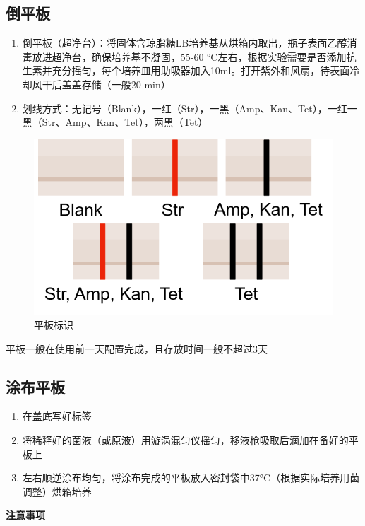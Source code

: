 \documentclass[
]{book}
\providecommand{\tightlist}{%
  \setlength{\itemsep}{0pt}\setlength{\parskip}{0pt}}
\begin{document}
\hypertarget{ux5012ux5e73ux677f}{%
\subsection{倒平板}\label{ux5012ux5e73ux677f}}

\begin{enumerate}
\def\labelenumi{\arabic{enumi}.}
\item
  倒平板（超净台）：将固体含琼脂糖LB培养基从烘箱内取出，瓶子表面乙醇消毒放进超净台，确保培养基不凝固，55-60
  °C左右，根据实验需要是否添加抗生素并充分摇匀，每个培养皿用助吸器加入10ml。打开紫外和风扇，待表面冷却风干后盖盖存储（一般20
  min）
\item
  划线方式：无记号（Blank），一红（Str），一黑（Amp、Kan、Tet），一红一黑（Str、Amp、Kan、Tet），两黑（Tet）
\end{enumerate}

\begin{figure}

{\centering \includegraphics[width=0.45\linewidth]{images/平板标识} 

}

\caption{平板标识}\label{fig:unnamed-chunk-1}
\end{figure}

平板一般在使用前一天配置完成，且存放时间一般不超过3天

\hypertarget{ux6d82ux5e03ux5e73ux677f}{%
\subsection{涂布平板}\label{ux6d82ux5e03ux5e73ux677f}}

\begin{enumerate}
\def\labelenumi{\arabic{enumi}.}
\tightlist
\item
  在盖底写好标签
\item
  将稀释好的菌液（或原液）用漩涡混匀仪摇匀，移液枪吸取后滴加在备好的平板上
\item
  左右顺逆涂布均匀，将涂布完成的平板放入密封袋中37°C（根据实际培养用菌调整）烘箱培养
\end{enumerate}

\textbf{注意事项}
\end{document}
